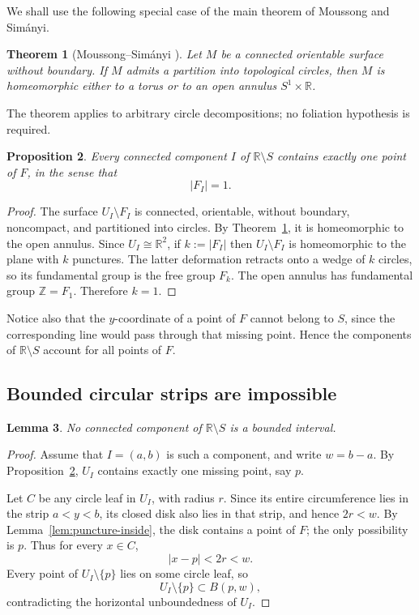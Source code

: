 \documentclass[11pt]{article}
\newtheorem{theorem}{Theorem}[section]
\newtheorem{lemma}[theorem]{Lemma}
\newtheorem{proposition}[theorem]{Proposition}
\newcommand{\R}{\mathbb{R}}
\newcommand{\Z}{\mathbb{Z}}
\begin{document}
We shall use the following special case of the main theorem of Moussong and Sim\'anyi.

\begin{theorem}[Moussong--Sim\'anyi \cite{MoussongSimanyi}]\label{thm:MS}
Let $M$ be a connected orientable surface without boundary. If $M$ admits a partition into topological circles, then $M$ is homeomorphic either to a torus or to an open annulus $S^1\times\R$.
\end{theorem}

The theorem applies to arbitrary circle decompositions; no foliation hypothesis is required.

\begin{proposition}\label{prop:onepuncturecomponent}
Every connected component $I$ of $\R\setminus S$ contains exactly one point of $F$, in the sense that
\[
|F_I|=1.
\]
\end{proposition}

\begin{proof}
The surface $U_I\setminus F_I$ is connected, orientable, without boundary, noncompact, and partitioned into circles. By Theorem~\ref{thm:MS}, it is homeomorphic to the open annulus. Since $U_I\cong\R^2$, if $k:=|F_I|$ then $U_I\setminus F_I$ is homeomorphic to the plane with $k$ punctures. The latter deformation retracts onto a wedge of $k$ circles, so its fundamental group is the free group $F_k$. The open annulus has fundamental group $\Z=F_1$. Therefore $k=1$.
\end{proof}

Notice also that the $y$-coordinate of a point of $F$ cannot belong to $S$, since the corresponding line would pass through that missing point. Hence the components of $\R\setminus S$ account for all points of $F$.

\subsection{Bounded circular strips are impossible}

\begin{lemma}\label{lem:noboundedstrip}
No connected component of $\R\setminus S$ is a bounded interval.
\end{lemma}

\begin{proof}
Assume that $I=(a,b)$ is such a component, and write $w=b-a$. By Proposition~\ref{prop:onepuncturecomponent}, $U_I$ contains exactly one missing point, say $p$.

Let $C$ be any circle leaf in $U_I$, with radius $r$. Since its entire circumference lies in the strip $a<y<b$, its closed disk also lies in that strip, and hence $2r<w$. By Lemma~\ref{lem:puncture-inside}, the disk contains a point of $F$; the only possibility is $p$. Thus for every $x\in C$,
\[
|x-p|<2r<w.
\]
Every point of $U_I\setminus\{p\}$ lies on some circle leaf, so
\[
U_I\setminus\{p\}\subset B(p,w),
\]
contradicting the horizontal unboundedness of $U_I$.
\end{proof}
\end{document}
